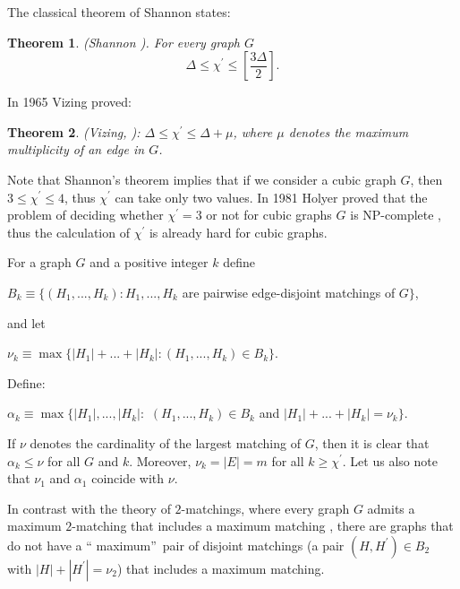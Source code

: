 \documentclass[fleqn,12pt,twoside]{article}
\newtheorem{theorem}{Theorem}
\begin{document}
The classical theorem of Shannon states:

\begin{theorem}
(Shannon \cite{Shannon}). For every graph $G$\begin{equation}
\Delta\leq \chi ^{\prime }\leq \left[ \frac{3\Delta}{2}\right].
\end{equation}
\end{theorem}

In 1965 Vizing proved:

\begin{theorem}
(Vizing, \cite{Vizing}): $\Delta\leq \chi ^{\prime }\leq \Delta +\mu
$, where $\mu$ denotes the maximum multiplicity of an edge in $G$.
\end{theorem}

Note that Shannon's theorem implies that if we consider a cubic
graph $G$, then $3\leq \chi ^{\prime }\leq 4$, thus $\chi ^{\prime
}$ can take
only two values. In 1981 Holyer proved that the problem of deciding whether $\chi ^{\prime }=3$ or not for cubic graphs $G$ is NP-complete \cite {Holyer}, thus the calculation of $\chi ^{\prime }$ is already hard
for cubic graphs.

For a graph $G$ and a positive integer $k$ define

\begin{center}
$B_{k}\equiv \{(H_{1},...,H_{k}):H_{1},...,H_{k}$ are pairwise
edge-disjoint matchings of $G\}$,
\end{center}

and let

\begin{center}
$\nu _{k}\equiv \max \{\left\vert H_{1}\right\vert +...+\left\vert
H_{k}\right\vert :(H_{1},...,H_{k})\in B_{k}\}$.
\end{center}

Define:

\begin{center}
$\alpha _{k}\equiv \max \{\left\vert H_{1}\right\vert
,...,\left\vert H_{k}\right\vert :$ $(H_{1},...,H_{k})\in B_{k}$ and
$\left\vert H_{1}\right\vert +...+\left\vert H_{k}\right\vert =\nu
_{k}\}$.
\end{center}

If $\nu $ denotes the cardinality of the largest matching of $G$,
then it
is clear that $\alpha _{k}\leq \nu $ for all $G$ and $k$. Moreover, $\nu _{k}=\left\vert E\right\vert =m$ for all $k\geq \chi ^{\prime
}$. Let us also note that $\nu _{1}$ and $\alpha _{1}$ coincide with
$\nu $.

In contrast with the theory of $2$-matchings, where every graph $G$
admits a maximum $2$-matching that includes a maximum matching
\cite{Lov}, there are graphs that do not have a \textquotedblleft
maximum\textquotedblright\ pair of disjoint matchings (a pair
$(H,H^{\prime })\in B_{2}$ with $\left\vert H\right\vert +\left\vert
H^{\prime }\right\vert =\nu _{2}$) that includes a maximum matching.
\end{document}
